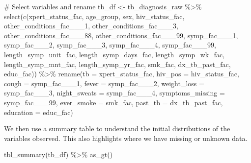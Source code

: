 \documentclass[
  letterpaper,
]{latex/krantz}
\makeatletter
\newenvironment{Shaded}{\begin{snugshade}}{\end{snugshade}}
\newcommand{\AttributeTok}[1]{\textcolor[rgb]{0.40,0.45,0.13}{#1}}
\newcommand{\CommentTok}[1]{\textcolor[rgb]{0.37,0.37,0.37}{#1}}
\newcommand{\FunctionTok}[1]{\textcolor[rgb]{0.28,0.35,0.67}{#1}}
\newcommand{\NormalTok}[1]{\textcolor[rgb]{0.00,0.23,0.31}{#1}}
\newcommand{\OtherTok}[1]{\textcolor[rgb]{0.00,0.23,0.31}{#1}}
\newcommand{\SpecialCharTok}[1]{\textcolor[rgb]{0.37,0.37,0.37}{#1}}
\newenvironment{kframe}{%
\medskip{}
\setlength{\fboxsep}{.8em}
 \def\at@end@of@kframe{}%
 \ifinner\ifhmode%
  \def\at@end@of@kframe{\end{minipage}}%
  \begin{minipage}{\columnwidth}%
 \fi\fi%
 \def\FrameCommand##1{\hskip\@totalleftmargin \hskip-\fboxsep
 \colorbox{shadecolor}{##1}\hskip-\fboxsep
     \hskip-\linewidth \hskip-\@totalleftmargin \hskip\columnwidth}%
 \MakeFramed {\advance\hsize-\width
   \@totalleftmargin\z@ \linewidth\hsize
   \@setminipage}}%
 {\par\unskip\endMakeFramed%
 \at@end@of@kframe}
\renewenvironment{Shaded}{\begin{kframe}}{\end{kframe}}
\makeatother
\begin{document}
\begin{Shaded}
\begin{Highlighting}[]
\CommentTok{\# Select variables and rename}
\NormalTok{tb\_df }\OtherTok{\textless{}{-}}\NormalTok{ tb\_diagnosis\_raw }\SpecialCharTok{\%\textgreater{}\%} 
  \FunctionTok{select}\NormalTok{(}\FunctionTok{c}\NormalTok{(xpert\_status\_fac, age\_group, sex, hiv\_status\_fac,}
\NormalTok{           other\_conditions\_fac\_\_\_1, other\_conditions\_fac\_\_\_3,}
\NormalTok{           other\_conditions\_fac\_\_\_88, other\_conditions\_fac\_\_\_99,}
\NormalTok{           symp\_fac\_\_\_1, symp\_fac\_\_\_2, symp\_fac\_\_\_3, symp\_fac\_\_\_4, }
\NormalTok{           symp\_fac\_\_\_99, length\_symp\_unit\_fac, length\_symp\_days\_fac,}
\NormalTok{           length\_symp\_wk\_fac, length\_symp\_mnt\_fac, length\_symp\_yr\_fac,}
\NormalTok{           smk\_fac, dx\_tb\_past\_fac, educ\_fac)) }\SpecialCharTok{\%\textgreater{}\%}
    \FunctionTok{rename}\NormalTok{(}\AttributeTok{tb =}\NormalTok{ xpert\_status\_fac, }\AttributeTok{hiv\_pos =}\NormalTok{ hiv\_status\_fac,}
           \AttributeTok{cough =}\NormalTok{ symp\_fac\_\_\_1, }\AttributeTok{fever =}\NormalTok{ symp\_fac\_\_\_2, }
           \AttributeTok{weight\_loss =}\NormalTok{ symp\_fac\_\_\_3, }\AttributeTok{night\_sweats =}\NormalTok{ symp\_fac\_\_\_4, }
           \AttributeTok{symptoms\_missing =}\NormalTok{ symp\_fac\_\_\_99,}
           \AttributeTok{ever\_smoke =}\NormalTok{ smk\_fac, }
           \AttributeTok{past\_tb =}\NormalTok{ dx\_tb\_past\_fac, }\AttributeTok{education =}\NormalTok{ educ\_fac)}
\end{Highlighting}
\end{Shaded}

We then use a summary table  to understand
the initial distributions of the variables observed. This also
highlights where we have missing or unknown data.

\begin{Shaded}
\begin{Highlighting}[]
\FunctionTok{tbl\_summary}\NormalTok{(tb\_df) }\SpecialCharTok{\%\textgreater{}\%}
  \FunctionTok{as\_gt}\NormalTok{()}
\end{Highlighting}
\end{Shaded}
\end{document}
